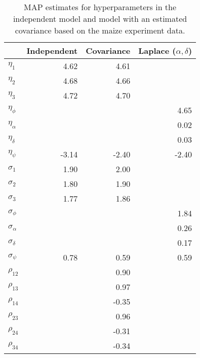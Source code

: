 \begin{table}[ht]
\centering
\caption{MAP estimates for hyperparameters in the independent model and model with an estimated covariance based on the maize experiment data.} 
\label{t:map}
\begin{tabular}{l|rrr|}
  \hline
 & Independent & Covariance & Laplace ($\alpha,\delta$) \\ 
  \hline
$\eta_1$ & 4.62 & 4.61 & \\ 
  $\eta_2$ & 4.68 & 4.66 & \\ 
  $\eta_3$ & 4.72 & 4.70 & \\ 
  $\eta_\phi$ &&& 4.65 \\
  $\eta_\alpha$ &&& 0.02  \\
  $\eta_\delta$ &&& 0.03 \\
  $\eta_\psi$ & -3.14 & -2.40 & -2.40 \\
   \hline
$\sigma_1$ & 1.90 & 2.00 &\\ 
  $\sigma_2$ & 1.80 & 1.90 &\\ 
  $\sigma_3$ & 1.77 & 1.86 &\\ 
  $\sigma_\phi$ &&& 1.84 \\
  $\sigma_\alpha$ &&& 0.26 \\
  $\sigma_\delta$ &&& 0.17 \\
  $\sigma_\psi$ & 0.78 & 0.59 & 0.59 \\ 
  
   \hline
$\rho_{12}$ &  & 0.90 &\\ 
  $\rho_{13}$ &  & 0.97 &\\ 
  $\rho_{14}$ &  & -0.35 &\\ 
  $\rho_{23}$ &  & 0.96 &\\ 
  $\rho_{24}$ &  & -0.31 &\\ 
  $\rho_{34}$ &  & -0.34 &\\ 
   \hline
\end{tabular}
\end{table}
